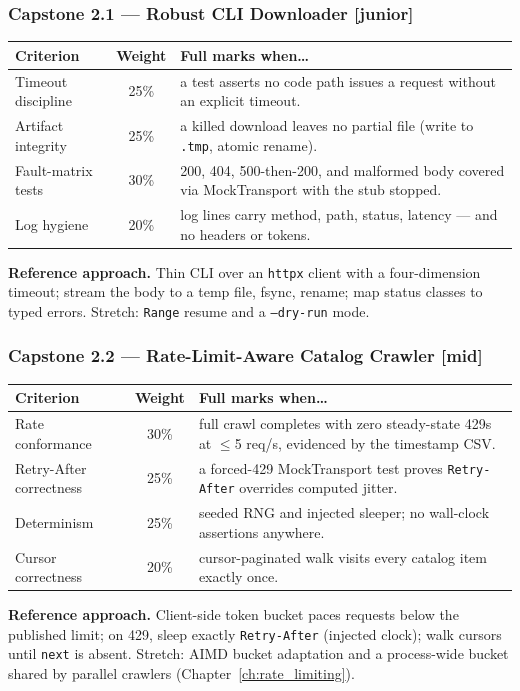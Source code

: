 \subsubsection*{Capstone 2.1 --- Robust CLI Downloader [junior]}
\begin{center}\small
\begin{tabularx}{\textwidth}{l c X}
\toprule
\textbf{Criterion} & \textbf{Weight} & \textbf{Full marks when\ldots} \\
\midrule
Timeout discipline & 25\% & a test asserts no code path issues a request without an explicit timeout. \\
Artifact integrity & 25\% & a killed download leaves no partial file (write to \texttt{.tmp}, atomic rename). \\
Fault-matrix tests & 30\% & 200, 404, 500-then-200, and malformed body covered via MockTransport with the stub stopped. \\
Log hygiene & 20\% & log lines carry method, path, status, latency --- and no headers or tokens. \\
\bottomrule
\end{tabularx}
\end{center}
\textbf{Reference approach.} Thin CLI over an \texttt{httpx} client with a
four-dimension timeout; stream the body to a temp file, fsync, rename;
map status classes to typed errors. Stretch: \texttt{Range} resume and a
\texttt{--dry-run} mode.

\subsubsection*{Capstone 2.2 --- Rate-Limit-Aware Catalog Crawler [mid]}
\begin{center}\small
\begin{tabularx}{\textwidth}{l c X}
\toprule
\textbf{Criterion} & \textbf{Weight} & \textbf{Full marks when\ldots} \\
\midrule
Rate conformance & 30\% & full crawl completes with zero steady-state 429s at $\leq$5 req/s, evidenced by the timestamp CSV. \\
Retry-After correctness & 25\% & a forced-429 MockTransport test proves \texttt{Retry-After} overrides computed jitter. \\
Determinism & 25\% & seeded RNG and injected sleeper; no wall-clock assertions anywhere. \\
Cursor correctness & 20\% & cursor-paginated walk visits every catalog item exactly once. \\
\bottomrule
\end{tabularx}
\end{center}
\textbf{Reference approach.} Client-side token bucket paces requests below
the published limit; on 429, sleep exactly \texttt{Retry-After} (injected
clock); walk cursors until \texttt{next} is absent. Stretch: AIMD bucket
adaptation and a process-wide bucket shared by parallel crawlers
(Chapter~\ref{ch:rate_limiting}).

